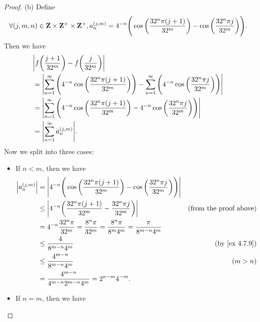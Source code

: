 \begin{proof}{(b)}
  Define
  \[
    \forall (j, m, n) \in \mathbf{Z} \times \mathbf{Z}^+ \times \mathbf{Z}^+, a_n^{(j, m)} = 4^{-n} \Bigg(\cos\bigg(\frac{32^n \pi (j + 1)}{32^m}\bigg) - \cos\bigg(\frac{32^n \pi j}{32^m}\bigg)\Bigg).
  \]
  Then we have
  \begin{align*}
     & \abs{f\bigg(\frac{j + 1}{32^m}\bigg) - f\bigg(\frac{j}{32^m}\bigg)}                                                                                                           \\
     & = \abs{\sum_{n = 1}^\infty \Bigg(4^{-n} \cos\bigg(\frac{32^n \pi (j + 1)}{32^m}\bigg)\Bigg) - \sum_{n = 1}^\infty \Bigg(4^{-n} \cos\bigg(\frac{32^n \pi j}{32^m}\bigg)\Bigg)} \\
     & = \abs{\sum_{n = 1}^\infty \Bigg(4^{-n} \cos\bigg(\frac{32^n \pi (j + 1)}{32^m}\bigg) - 4^{-n} \cos\bigg(\frac{32^n \pi j}{32^m}\bigg)\Bigg)}                                 \\
     & = \abs{\sum_{n = 1}^\infty a_n^{(j, m)}}.
  \end{align*}
  Now we split into three cases:
  \begin{itemize}
    \item If \(n < m\), then we have
          \begin{align*}
            \abs{a_n^{(j, m)}} & = \abs{4^{-n} \Bigg(\cos\bigg(\frac{32^n \pi (j + 1)}{32^m}\bigg) - \cos\bigg(\frac{32^n \pi j}{32^m}\bigg)\Bigg)}                                 \\
                               & \leq \abs{4^{-n} \bigg(\frac{32^n \pi (j + 1)}{32^m} - \frac{32^n \pi j}{32^m}\bigg)}                              & \text{(from the proof above)} \\
                               & = 4^{-n} \frac{32^n \pi}{32^m} = \frac{8^n \pi}{32^m} = \frac{8^n \pi}{8^m 4^m} = \frac{\pi}{8^{m - n} 4^m}                                        \\
                               & \leq \frac{4}{8^{m - n} 4^m}                                                                                       & \text{(by \cref{ex 4.7.9})}   \\
                               & \leq \frac{4^{m - n}}{8^{m - n} 4^m}                                                                               & (m > n)                       \\
                               & = \frac{4^{m - n}}{4^{m - n} 2^{m - n} 4^m} = 2^{n - m} 4^{-m}.
          \end{align*}
    \item If \(n = m\), then we have

\end{itemize}
\end{proof}
